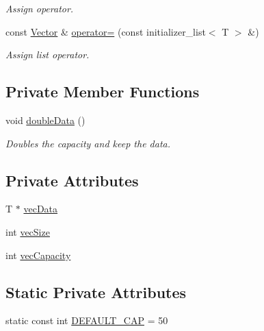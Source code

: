 \begin{DoxyCompactItemize}
\begin{DoxyCompactList}\small\item\em Assign operator. \end{DoxyCompactList}\item 
const \hyperlink{classGreati_1_1Vector}{Vector} \& \hyperlink{classGreati_1_1Vector_ac7b27acbe4aaf67b2c8834d97473a292}{operator=} (const initializer\+\_\+list$<$ T $>$ \&)\hypertarget{classGreati_1_1Vector_ac7b27acbe4aaf67b2c8834d97473a292}{}\label{classGreati_1_1Vector_ac7b27acbe4aaf67b2c8834d97473a292}

\begin{DoxyCompactList}\small\item\em Assign list operator. \end{DoxyCompactList}\end{DoxyCompactItemize}
\subsection*{Private Member Functions}
\begin{DoxyCompactItemize}
\item 
void \hyperlink{classGreati_1_1Vector_a0401cfad220c754004bc9e23a6678c1b}{double\+Data} ()\hypertarget{classGreati_1_1Vector_a0401cfad220c754004bc9e23a6678c1b}{}\label{classGreati_1_1Vector_a0401cfad220c754004bc9e23a6678c1b}

\begin{DoxyCompactList}\small\item\em Doubles the capacity and keep the data. \end{DoxyCompactList}\end{DoxyCompactItemize}
\subsection*{Private Attributes}
\begin{DoxyCompactItemize}
\item 
T $\ast$ \hyperlink{classGreati_1_1Vector_a95cfc9dbb67abb214cc2516c39c68d23}{vec\+Data}
\item 
int \hyperlink{classGreati_1_1Vector_a037b83266461e0b25f963422533efdf0}{vec\+Size}
\item 
int \hyperlink{classGreati_1_1Vector_a54359e7c9f68cb4ea6cae8be750b989a}{vec\+Capacity}
\end{DoxyCompactItemize}
\subsection*{Static Private Attributes}
\begin{DoxyCompactItemize}
\item 
static const int \hyperlink{classGreati_1_1Vector_a4f65eea1b021f9ed7a2e068e9022de5a}{D\+E\+F\+A\+U\+L\+T\+\_\+\+C\+AP} = 50
\end{DoxyCompactItemize}


